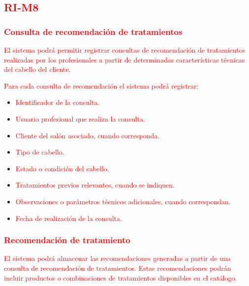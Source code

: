 \subsection{\textcolor{red}{RI-M8}}

\subsubsection*{\textcolor{red}{Consulta de recomendación de tratamientos}}

\textcolor{red}{El sistema podrá permitir registrar consultas de recomendación de tratamientos realizadas por los profesionales a partir de determinadas características técnicas del cabello del cliente.}

\textcolor{red}{Para cada consulta de recomendación el sistema podrá registrar:}

\begin{itemize}
    \item \textcolor{red}{Identificador de la consulta.}
    \item \textcolor{red}{Usuario profesional que realiza la consulta.}
    \item \textcolor{red}{Cliente del salón asociado, cuando corresponda.}
    \item \textcolor{red}{Tipo de cabello.}
    \item \textcolor{red}{Estado o condición del cabello.}
    \item \textcolor{red}{Tratamientos previos relevantes, cuando se indiquen.}
    \item \textcolor{red}{Observaciones o parámetros técnicos adicionales, cuando correspondan.}
    \item \textcolor{red}{Fecha de realización de la consulta.}
\end{itemize}

\subsubsection*{\textcolor{red}{Recomendación de tratamiento}}

\textcolor{red}{El sistema podrá almacenar las recomendaciones generadas a partir de una consulta de recomendación de tratamientos. Estas recomendaciones podrán incluir productos o combinaciones de tratamientos disponibles en el catálogo.}

